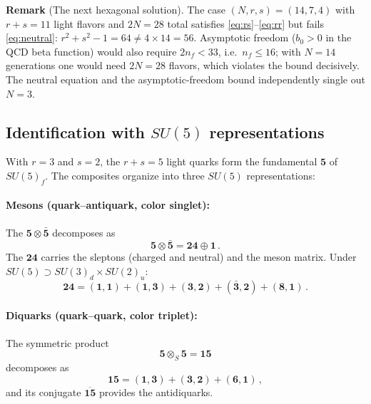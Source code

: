 \documentclass[12pt,a4paper]{article}
\begin{document}
\medskip
\noindent\textbf{Remark} (The next hexagonal solution).
The case $(N, r, s) = (14, 7, 4)$ with
$r + s = 11$ light flavors and $2N = 28$ total satisfies
\eqref{eq:rs}--\eqref{eq:rr} but fails \eqref{eq:neutral}:
$r^2 + s^2 - 1 = 64 \neq 4 \times 14 = 56$.
Asymptotic freedom ($b_0 > 0$ in the QCD beta function) would
also require $2n_f < 33$, i.e.\ $n_f \leq 16$; with $N = 14$
generations one would need $2N = 28$ flavors, which violates the
bound decisively.  The neutral equation and the asymptotic-freedom
bound independently single out $N = 3$.

\subsection{Identification with $SU(5)$ representations}
With $r = 3$ and $s = 2$, the $r + s = 5$ light quarks form the
fundamental $\mathbf{5}$ of $SU(5)_f$.  The composites organize
into three $SU(5)$ representations:

\paragraph{Mesons (quark--antiquark, color singlet):}
The $\mathbf{5} \otimes \bar{\mathbf{5}}$ decomposes as
\begin{equation}
\mathbf{5} \otimes \bar{\mathbf{5}}
= \mathbf{24} \oplus \mathbf{1}\,.
\end{equation}
The $\mathbf{24}$ carries the sleptons (charged and neutral) and
the meson matrix.  Under
$SU(5) \supset SU(3)_d \times SU(2)_u$:
\begin{equation}
\mathbf{24} = (\mathbf{1},\mathbf{1})
+ (\mathbf{1},\mathbf{3})
+ (\mathbf{3},\mathbf{2})
+ (\bar{\mathbf{3}},\mathbf{2})
+ (\mathbf{8},\mathbf{1})\,.
\end{equation}

\paragraph{Diquarks (quark--quark, color triplet):}
The symmetric product
\begin{equation}
\mathbf{5} \otimes_S \mathbf{5}
= \mathbf{15}
\end{equation}
decomposes as
\begin{equation}
\mathbf{15} = (\mathbf{1},\mathbf{3})
+ (\mathbf{3},\mathbf{2})
+ (\mathbf{6},\mathbf{1})\,,
\end{equation}
and its conjugate $\overline{\mathbf{15}}$ provides the
antidiquarks.
\end{document}

